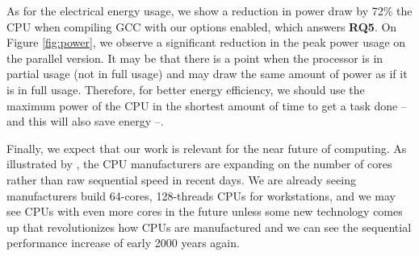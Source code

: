 As for the electrical energy usage, we show a reduction in power draw by 72\% the
CPU when compiling GCC with our options enabled, which answers \textbf{RQ5}. On
Figure \ref{fig:power}, we observe a significant reduction in the peak power
usage on the parallel version. It may be that there is a point when the
processor is in partial usage (not in full usage) and may draw the same amount
of power as if it is in full usage. Therefore, for better energy efficiency, we
should use the maximum power of the CPU in the shortest amount of time to get a
task done -- and this will also save energy --.

Finally, we expect that our work is relevant for the near future of computing.
As illustrated by \cite{42years}, the CPU manufacturers are expanding on the
number of cores rather than raw sequential speed in recent days. We are already
seeing manufacturers build 64-cores, 128-threads CPUs for workstations, and we
may see CPUs with even more cores in the future unless some new technology
comes up that revolutionizes how CPUs are manufactured and we can see the
sequential performance increase of early 2000 years again.

